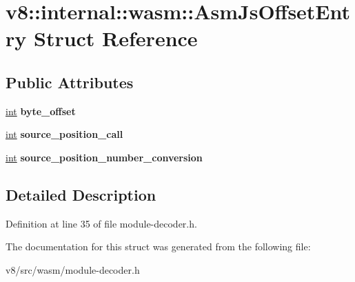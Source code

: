 \hypertarget{structv8_1_1internal_1_1wasm_1_1AsmJsOffsetEntry}{}\section{v8\+:\+:internal\+:\+:wasm\+:\+:Asm\+Js\+Offset\+Entry Struct Reference}
\label{structv8_1_1internal_1_1wasm_1_1AsmJsOffsetEntry}
\subsection*{Public Attributes}
\begin{DoxyCompactItemize}
\item 
\mbox{\label{structv8_1_1internal_1_1wasm_1_1AsmJsOffsetEntry_ab51fbaf7ce0ef85484f970eec62fdfa3}} 
\mbox{\hyperlink{classint}{int}} {\bfseries byte\+\_\+offset}
\item 
\mbox{\label{structv8_1_1internal_1_1wasm_1_1AsmJsOffsetEntry_a1e70c48e57d842c60e54c289beb878ea}} 
\mbox{\hyperlink{classint}{int}} {\bfseries source\+\_\+position\+\_\+call}
\item 
\mbox{\label{structv8_1_1internal_1_1wasm_1_1AsmJsOffsetEntry_ae9631f1da9deba31c3e47d6627be6e45}} 
\mbox{\hyperlink{classint}{int}} {\bfseries source\+\_\+position\+\_\+number\+\_\+conversion}
\end{DoxyCompactItemize}


\subsection{Detailed Description}


Definition at line 35 of file module-\/decoder.\+h.



The documentation for this struct was generated from the following file\+:\begin{DoxyCompactItemize}
\item 
v8/src/wasm/module-\/decoder.\+h\end{DoxyCompactItemize}
